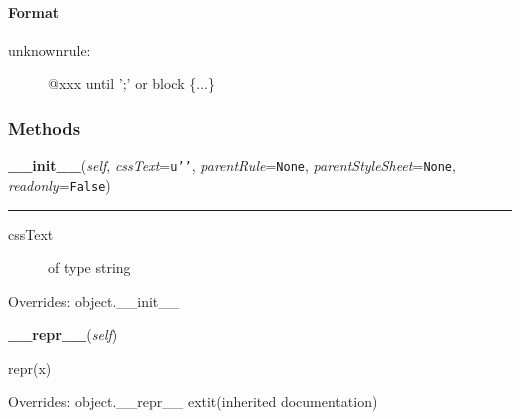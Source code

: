 
\hypertarget{format}{}
\paragraph*{Format}
\label{format}
\begin{description}
\item[{unknownrule:}] \leavevmode 
@xxx until ';' or block {\{}...{\}}

\end{description}


  \subsubsection{Methods}

    \vspace{0.5ex}

\hspace{.8\funcindent}\begin{boxedminipage}{\funcwidth}

    \raggedright \textbf{\_\_init\_\_}(\textit{self}, \textit{cssText}={\tt \texttt{u'}\texttt{}\texttt{'}}, \textit{parentRule}={\tt None}, \textit{parentStyleSheet}={\tt None}, \textit{readonly}={\tt False})

    \vspace{-1.5ex}

    \rule{\textwidth}{0.5\fboxrule}
\setlength{\parskip}{2ex}
\begin{description}
\item[{cssText}] \leavevmode 
of type string

\end{description}
\setlength{\parskip}{1ex}
      Overrides: object.\_\_init\_\_

    \end{boxedminipage}

    \vspace{0.5ex}

\hspace{.8\funcindent}\begin{boxedminipage}{\funcwidth}

    \raggedright \textbf{\_\_repr\_\_}(\textit{self})

\setlength{\parskip}{2ex}
    repr(x)

\setlength{\parskip}{1ex}
      Overrides: object.\_\_repr\_\_ 	extit{(inherited documentation)}

    \end{boxedminipage}


